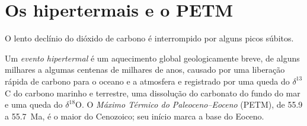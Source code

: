 \section{Os hipertermais e o PETM}\label{sec:b2:deep-time-climate:petm}

O lento declínio do dióxido de carbono é interrompido por alguns picos súbitos.

\begin{definition}\label{def:b2:deep-time-climate:petm}
Um \emph{evento hipertermal} é um aquecimento global geologicamente breve, de alguns
milhares a algumas centenas de milhares de anos, causado por uma liberação rápida de carbono para o oceano e a
atmosfera e registrado por uma queda do $\delta^{13}$C do carbono marinho e terrestre, uma
dissolução do carbonato do fundo do mar e uma queda do $\delta^{18}$O. O \emph{Máximo Térmico do
Paleoceno--Eoceno} (PETM), de 55.9 a \qty{55.7}{Ma}, é o
maior do Cenozoico; seu início marca a base do Eoceno.
\end{definition}

